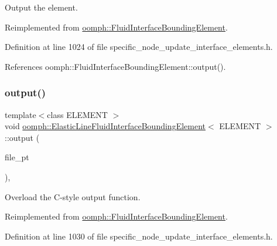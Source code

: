 Output the element. 



Reimplemented from \hyperlink{classoomph_1_1FluidInterfaceBoundingElement_af2c821d51d506221976a0c17e1615ac3}{oomph\+::\+Fluid\+Interface\+Bounding\+Element}.



Definition at line 1024 of file specific\+\_\+node\+\_\+update\+\_\+interface\+\_\+elements.\+h.



References oomph\+::\+Fluid\+Interface\+Bounding\+Element\+::output().

\mbox{\label{classoomph_1_1ElasticLineFluidInterfaceBoundingElement_a0979784b94ab8285a964ab14077b8320}} 
\subsubsection{\texorpdfstring{output()}{output()}\hspace{0.1cm}{\footnotesize\ttfamily [3/4]}}
{\footnotesize\ttfamily template$<$class E\+L\+E\+M\+E\+NT $>$ \\
void \hyperlink{classoomph_1_1ElasticLineFluidInterfaceBoundingElement}{oomph\+::\+Elastic\+Line\+Fluid\+Interface\+Bounding\+Element}$<$ E\+L\+E\+M\+E\+NT $>$\+::output (\begin{DoxyParamCaption}\item[{F\+I\+LE $\ast$}]{file\+\_\+pt }\end{DoxyParamCaption})\hspace{0.3cm}{\ttfamily [inline]}, {\ttfamily [virtual]}}



Overload the C-\/style output function. 



Reimplemented from \hyperlink{classoomph_1_1FluidInterfaceBoundingElement_a85cc62405429744e3e3585894315cb9e}{oomph\+::\+Fluid\+Interface\+Bounding\+Element}.



Definition at line 1030 of file specific\+\_\+node\+\_\+update\+\_\+interface\+\_\+elements.\+h.



